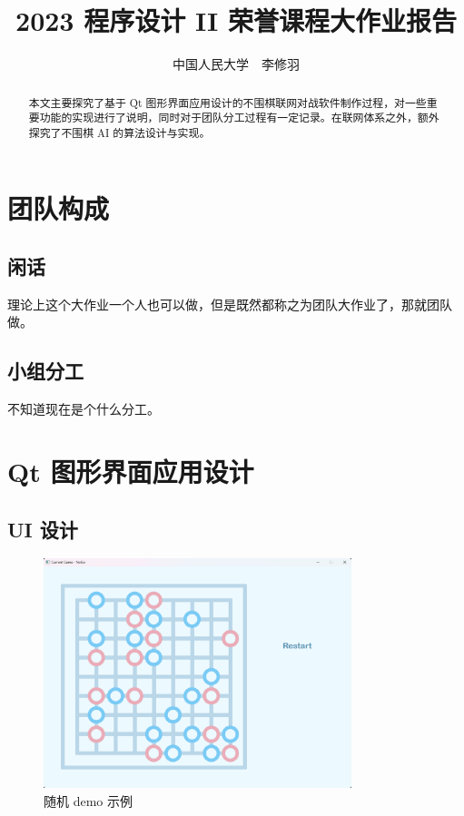 \documentclass{noithesis}
\begin{document}
	
	\title{2023 程序设计 II 荣誉课程大作业报告}
	\author{中国人民大学~~李修羽}
	
	\maketitle
	
	\begin{abstract}
		本文主要探究了基于 Qt 图形界面应用设计的不围棋联网对战软件制作过程，对一些重要功能的实现进行了说明，同时对于团队分工过程有一定记录。在联网体系之外，额外探究了不围棋 AI 的算法设计与实现。
	\end{abstract}

	\tableofcontents
	\setcounter{page}{0}
	\thispagestyle{empty}
	\newpage
	
	\section{团队构成}
	
	\subsection{闲话}
	
	理论上这个大作业一个人也可以做，但是既然都称之为团队大作业了，那就团队做。
	
	\subsection{小组分工}
	
	不知道现在是个什么分工。
	
	\section{Qt 图形界面应用设计}
	
	\subsection{UI 设计}
	
	\begin{figure}[!htb]{
		\centering
		\includegraphics[width=0.8\textwidth]{img/UI.png}
			\caption{随机 demo 示例}
	}
	\end{figure}
\end{document}
